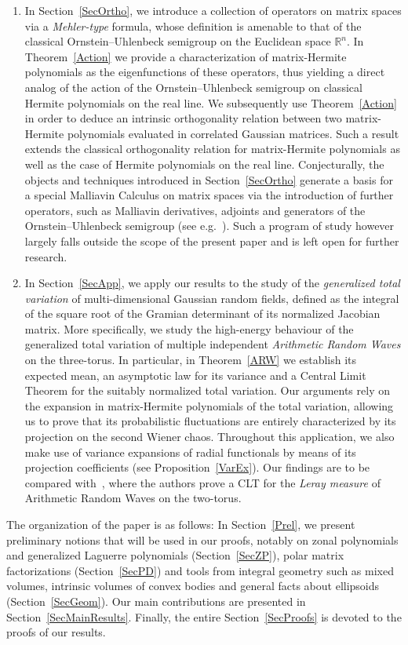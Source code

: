 \documentclass[AHL,Unicode,longabstracts,published]{cedram}
\newcommand{\R}{\mathbb{R}}
\begin{document}
\begin{enumerate}
\item In Section~\ref{SecOrtho}, we introduce a collection of operators on matrix spaces via a \emph{Mehler-type} formula, whose definition is amenable to that of the classical Ornstein--Uhlenbeck semigroup on the Euclidean space $\R^n$. In Theorem~\ref{Action} we provide a characterization of matrix-Hermite polynomials as the eigenfunctions of these operators, thus yielding a direct analog of the action of the Ornstein--Uhlenbeck semigroup on classical Hermite polynomials on the real line. We subsequently use Theorem~\ref{Action} in order to deduce an intrinsic orthogonality relation between two matrix-Hermite polynomials evaluated in correlated Gaussian matrices. Such a result extends the classical orthogonality relation for matrix-Hermite polynomials as well as the case of Hermite polynomials on the real line. Conjecturally, the objects and techniques introduced in Section~\ref{SecOrtho} generate a basis for a special Malliavin Calculus on matrix spaces via the introduction of further operators, such as Malliavin derivatives, adjoints and generators of the Ornstein--Uhlenbeck semigroup (see e.g.~\cite{NP12,N06}). Such a program of study however largely falls outside the scope of the present paper and is left open for further research.
\item In Section~\ref{SecApp}, we apply our results to the study of the \emph{generalized total variation} of multi-dimensional Gaussian random fields, defined as the integral of the square root of the Gramian determinant of its normalized Jacobian matrix. More specifically, we study the high-energy behaviour of the generalized total variation of multiple independent \emph{Arithmetic Random Waves} on the three-torus. In particular, in Theorem~\ref{ARW} we establish its expected mean, an asymptotic law for its variance and a Central Limit Theorem for the suitably normalized total variation. Our arguments rely on the expansion in matrix-Hermite polynomials of the total variation, allowing us to prove that its probabilistic fluctuations are entirely characterized by its projection on the second Wiener chaos. Throughout this application, we also make use of variance expansions of radial functionals by means of its projection coefficients (see Proposition~\ref{VarEx}). Our findings are to be compared with~\cite[Theorem~1]{PR16}, where the authors prove a CLT for the \emph{Leray measure} of Arithmetic Random Waves on the two-torus.
\end{enumerate}


The organization of the paper is as follows: In Section~\ref{Prel}, we present preliminary notions that will be used in our proofs, notably on zonal polynomials and generalized Laguerre polynomials (Section~\ref{SecZP}), polar matrix factorizations (Section~\ref{SecPD}) and tools from integral geometry such as mixed volumes, intrinsic volumes of convex bodies and general facts about ellipsoids (Section~\ref{SecGeom}). Our main contributions are presented in Section~\ref{SecMainResults}. Finally, the entire Section~\ref{SecProofs} is devoted to the proofs of our results.
\end{document}
